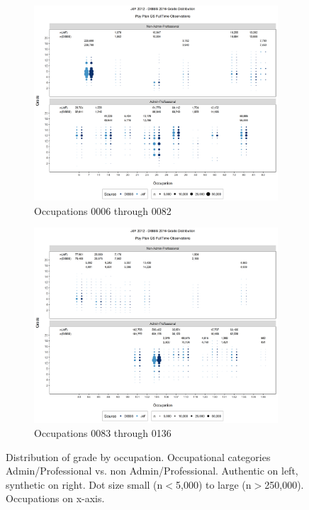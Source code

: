 \documentclass[10pt, letterpaper]{article}
\begin{document}
\begin{spacing}{1.0}
\clearpage

\begin{figure}[]
    \centering
    \begin{subfigure}{1\textwidth}
        \centering
        \includegraphics[width=6in, trim={0 200px 0 165px}, clip]{JdFDIBBSGSFullTimeGradeAdminProfessionalOccupation1.png}
        \caption{Occupations 0006 through 0082}
        \vspace{20pt}
    \end{subfigure}
    \begin{subfigure}{1\textwidth}
        \centering
        \includegraphics[width=6in, trim={0 200px 0 165px}, clip]{JdFDIBBSGSFullTimeGradeAdminProfessionalOccupation21.png}
        \caption{Occupations 0083 through 0136}
        \vspace{10pt}
    \end{subfigure}
    \caption{Distribution of grade by occupation.  Occupational categories Admin/Professional vs. non Admin/Professional.  Authentic on left, synthetic on right.  Dot size small (n$<$5,000) to large (n$>$250,000).  Occupations on x-axis.}
    \label{figure:JdFDIBBSGSFullTimeGradeAdminProfessionalOccupation}
\end{figure}


\end{spacing}
\end{document}
